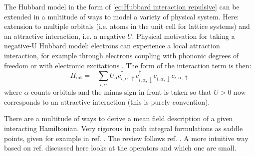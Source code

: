 \documentclass[../notes.tex]{subfiles}
\begin{document}
The Hubbard model  in the form of \cref{eq:Hubbard interaction repulsive} can be extended in a multitude of ways to model a variety of physical system.
Here: extension to multiple orbitals (i.e. atoms in the unit cell for lattice systems) and an attractive interaction, i.e. a negative \(U\).
Physical motivation for taking a negative-U Hubbard model: electrons can experience a local attraction interaction, for example through electrons coupling with phononic degrees of freedom or with electronic excitations \cite{micnasSuperconductivityNarrowbandSystems1990}.
The form of the interaction term is then:
\begin{equation}
	H_{\mathrm{int}} = -\sum_{i, \alpha} U_{\alpha} c_{i, \alpha, \uparrow}^{\dagger} c_{i, \alpha, \downarrow}^{\dagger} c_{i, \alpha, \downarrow} c_{i, \alpha, \uparrow}
	\label{eq:Hubbard interaction multiband}
\end{equation}
where \(\alpha\) counts orbitals and the minus sign in front is taken so that \(U > 0\) now corresponds to an attractive interaction (this is purely convention).

There are a multitude of ways to derive a mean field description of a given interacting Hamiltonian.
Very rigorous in path integral formulations as saddle points, given for example in ref. \cite{colemanIntroductionManyBodyPhysics2015}.
The review follows ref. \cite{huhtinenSuperconductivityNormalState2023}.
A more intuitive way based on ref. \cite{bruusManyBodyQuantumTheory2004} discussed here looks at the operators and which one are small. 
\end{document}
